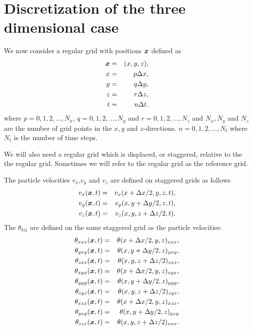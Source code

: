 \documentclass[11pt]{article}
\begin{document}
{\section*{Discretization of the three dimensional case}
We now consider a regular grid with positions $\mbox{\boldmath $x$}$ defined as
\begin{eqnarray}
\mbox{\boldmath $x$} & = & (x,y,z),\\
x   & = & p\Delta x,\\
y   & = & q\Delta y,\\
z   & = & r\Delta z,\\
t   & = & n\Delta t.
\end{eqnarray}
where $p=0,1,2,\ldots,N_x$, $q=0,1,2,\ldots,N_y$ and $r=0,1,2,\ldots,N_z$ and
$N_x,N_y$ and $N_z$ are the number of grid points in the $x,y$ and $z$-directions.
$n=0,1,2,\ldots,N_t$ where $N_t$ is the number of time steps.

We will also need a regular grid which is displaced, or staggered, relative to the the regular grid.
Sometimes we will refer to the regular grid as the reference grid.

The particle velocities  $v_x$,$v_y$ and $v_z$ are defined on staggered grids
as follows
%
\begin{eqnarray}
   v_x(\mbox{\boldmath $x$}, t) & = & v_x(x+\Delta x/2, y, z, t),\\
   v_y(\mbox{\boldmath $x$}, t) & = & v_y(x, y+\Delta y/2, z, t),\\
   v_z(\mbox{\boldmath $x$}, t) & = & v_z(x, y, z+\Delta z/2, t). 
\end{eqnarray}
%
The $\theta_{kij}$ are defined on the same staggered grid as the
particle velocities:
\begin{eqnarray}
   \theta_{xxx}(\mbox{\boldmath $x$}, t) & = & \theta(x+\Delta x/2,y,z)_{xxx},\\
   \theta_{yxy}(\mbox{\boldmath $x$}, t) & = & \theta(x,y+\Delta y/2,z)_{yxy},\\
   \theta_{zxz}(\mbox{\boldmath $x$}, t) & = & \theta(x,y,z+\Delta z/2)_{zxz},\\
   \theta_{xyx}(\mbox{\boldmath $x$}, t) & = & \theta(x+\Delta x/2,y,z)_{xyx},\\
   \theta_{yyy}(\mbox{\boldmath $x$}, t) & = & \theta(x,y+\Delta y/2,z)_{yyy},\\
   \theta_{zyz}(\mbox{\boldmath $x$}, t) & = & \theta(x,y,z+\Delta z/2  )_{zyz},\\
   \theta_{xzx}(\mbox{\boldmath $x$}, t) & = & \theta(x+\Delta x/2,y,z)_{xzx},\\
   \theta_{yzy}(\mbox{\boldmath $x$}, t) & = & \theta(x,y+\Delta y/2,z)_{yzy}\\
   \theta_{zzz}(\mbox{\boldmath $x$}, t) & = & \theta(x,y,z+\Delta z/2)_{xxx}.
\end{eqnarray}


}
\end{document}
